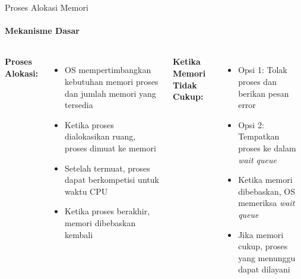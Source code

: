 \documentclass[10pt,aspectratio=169]{beamer}
\begin{document}
\begin{frame}{Proses Alokasi Memori}
    \framesubtitle{Mekanisme Dasar}
    
    \begin{columns}[T]
            \textbf{Proses Alokasi:}
            \begin{itemize}
                \item OS mempertimbangkan kebutuhan memori proses dan jumlah memori yang tersedia
                \item Ketika proses dialokasikan ruang, proses dimuat ke memori
                \item Setelah termuat, proses dapat berkompetisi untuk waktu CPU
                \item Ketika proses berakhir, memori dibebaskan kembali
            \end{itemize}
            
            \textbf{Ketika Memori Tidak Cukup:}
            \begin{itemize}
                \item Opsi 1: Tolak proses dan berikan pesan error
                \item Opsi 2: Tempatkan proses ke dalam \textit{wait queue}
                \item Ketika memori dibebaskan, OS memeriksa \textit{wait queue}
                \item Jika memori cukup, proses yang menunggu dapat dilayani
            \end{itemize}
    \end{columns}
\end{frame}
\end{document}
